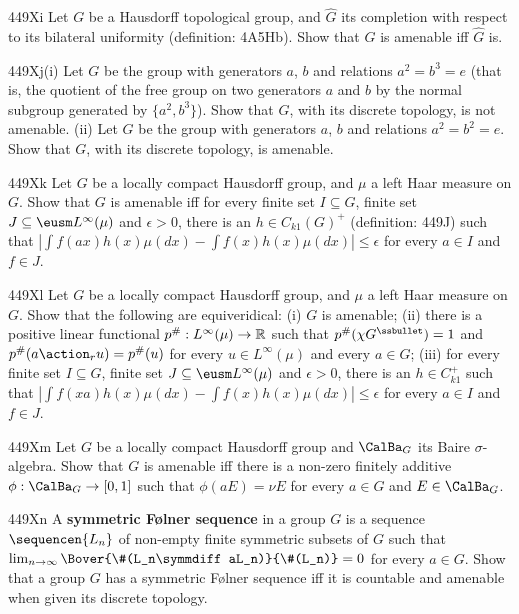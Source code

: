 {\spheader 449Xi Let $G$ be a Hausdorff topological group, and $\hat G$
its completion with respect to its bilateral uniformity (definition:
4A5Hb).   Show that $G$ is amenable iff $\hat G$ is.

\spheader 449Xj(i) Let $G$ be the group with generators $a$, $b$ and
relations $a^2=b^3=e$ (that is, the quotient of the free group on two
generators $a$ and $b$ by the normal subgroup generated by
$\{a^2,b^3\}$).   Show that $G$, with its discrete topology, is not
amenable.
(ii) Let $G$ be the group with generators $a$, $b$ and
relations $a^2=b^2=e$.   Show that $G$, with its discrete topology, is
amenable.   

\spheader 449Xk Let $G$ be a locally compact Hausdorff group, and $\mu$ a
left Haar measure on $G$.   Show that $G$ is amenable iff
for every finite set $I\subseteq G$, finite set
$J\subseteq\eusm L^{\infty}(\mu)$ and $\epsilon>0$, there is an
$h\in C_{k1}(G)^+$ (definition:  449J) such that
$|\int f(ax)h(x)\mu(dx)-\int f(x)h(x)\mu(dx)|\le\epsilon$
for every $a\in I$ and $f\in J$.   

\spheader 449Xl Let $G$ be a locally compact Hausdorff group,
and $\mu$ a left Haar measure on $G$.   Show that the following are
equiveridical:
(i) $G$ is amenable;
(ii) there is a positive linear functional
$p^{\#}:L^{\infty}(\mu)\to\Bbb R$ such that
$p^{\#}(\chi G^{\ssbullet})=1$ and
$p^{\#}(a\action_ru)=p^{\#}(u)$ for every $u\in L^{\infty}(\mu)$ and
every $a\in G$;
(iii) for every finite set $I\subseteq G$, finite set
$J\subseteq\eusm L^{\infty}(\mu)$ and $\epsilon>0$, there is an
$h\in C_{k1}^+$
such that $|\int f(xa)h(x)\mu(dx)-\int f(x)h(x)\mu(dx)|\le\epsilon$
for every $a\in I$ and $f\in J$.

\spheader 449Xm Let $G$ be a locally compact Hausdorff
group and
$\CalBa_G$ its Baire $\sigma$-algebra.    Show that
$G$ is amenable iff there is a non-zero finitely additive
$\phi:\CalBa_G\to[0,1]$
such that $\phi(aE)=\nu E$ for every $a\in G$ and $E\in\CalBa_G$.

\spheader 449Xn A {\bf symmetric F{\o}lner sequence} in a group $G$ is a
sequence $\sequencen{L_n}$ of non-empty finite
symmetric subsets of $G$ such that
$\lim_{n\to\infty}\Bover{\#(L_n\symmdiff aL_n)}{\#(L_n)}=0$ for every
$a\in G$.   Show that a group $G$ has a symmetric F{\o}lner sequence iff
it is countable and amenable when given its discrete topology.

}
